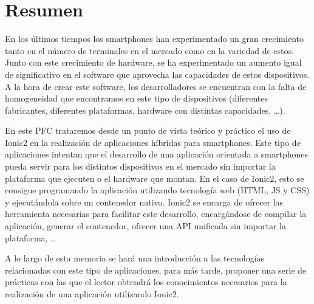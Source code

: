 \chapter*{Resumen}

En los últimos tiempos los smartphones han experimentado un gran crecimiento tanto en el número de terminales en el mercado como en la variedad de estos. Junto con este crecimiento de hardware, se ha experimentado un aumento igual de significativo en el software que aprovecha las capacidades de estos dispositivos. A la hora de crear este software, los desarrolladores se encuentran con la falta de homogeneidad que encontramos en este tipo de dispositivos (diferentes fabricantes, diferentes plataformas, hardware con distintas capacidades, \ldots).

En este PFC trataremos desde un punto de vista teórico y práctico el uso de Ionic2 en la realización de aplicaciones híbridas para smartphones. Este tipo de aplicaciones intentan que el desarrollo de una aplicación orientada a smartphones pueda servir para los distintos dispositivos en el mercado sin importar la plataforma que ejecuten o el hardware que montan. En el caso de Ionic2, esto se consigue programando la aplicación utilizando tecnología web (HTML, JS y CSS) y ejecutándola sobre un contenedor nativo. Ionic2 se encarga de ofrecer las herramienta necesarias para facilitar este desarrollo, encargándose de compilar la aplicación, generar el contenedor, ofrecer una API unificada sin importar la plataforma, \ldots

A lo largo de esta memoria se hará una introducción a las tecnologías relacionadas con este tipo de aplicaciones, para más tarde, proponer una serie de prácticas con las que el lector obtendrá los conocimientos necesarios para la realización de una aplicación utilizando Ionic2.
